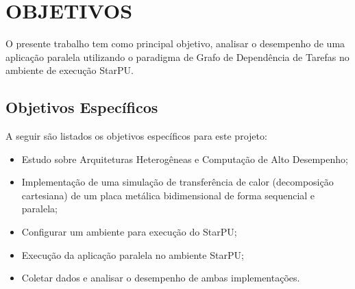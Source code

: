 
\chapter{OBJETIVOS}
\label{chap:objetivos}

O presente trabalho tem como principal objetivo, analisar o desempenho de uma aplicação paralela utilizando o paradigma de
Grafo de Dependência de Tarefas no ambiente de execução StarPU.

\section{Objetivos Específicos}

A seguir são listados os objetivos específicos para este projeto:\\

\begin{itemize}
    \item Estudo sobre Arquiteturas Heterogêneas e Computação de Alto Desempenho;
    \item Implementação de uma simulação de transferência de calor (decomposição cartesiana) de um placa metálica bidimensional de forma sequencial e paralela;
    \item Configurar um ambiente para execução do StarPU;
    \item Execução da aplicação paralela no ambiente StarPU;
    \item Coletar dados e analisar o desempenho de ambas implementações.
\end{itemize}
